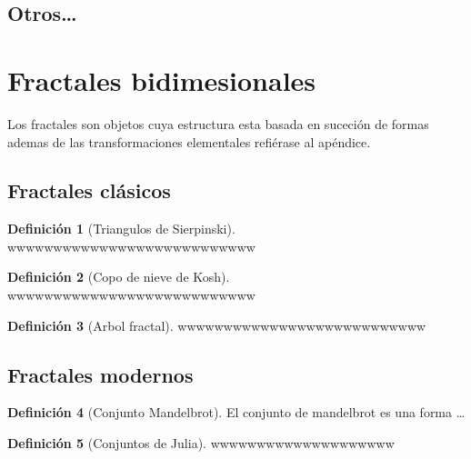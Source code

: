 \documentclass[
  16pt,
]{krantz}
\theoremstyle{definition}
\newtheorem{definition}{Definición}[chapter]
\theoremstyle{definition}
\theoremstyle{definition}
\theoremstyle{definition}
\theoremstyle{remark}
\begin{document}
\hypertarget{otros}{%
\subsection{Otros\ldots{}}\label{otros}}

\hypertarget{fractales-bidimesionales}{%
\section{Fractales bidimesionales}\label{fractales-bidimesionales}}

Los fractales son objetos cuya estructura esta basada en suceción de formas ademas de las transformaciones elementales refiérase al apéndice.

\hypertarget{fractales-cluxe1sicos}{%
\subsection{Fractales clásicos}\label{fractales-cluxe1sicos}}

\begin{definition}[Triangulos de Sierpinski]
\protect\hypertarget{def:sierpinski}{}{\label{def:sierpinski} {} }wwwwwwwwwwwwwwwwwwwwwwwwwww
\end{definition}

\begin{definition}[Copo de nieve de Kosh]
\protect\hypertarget{def:kosh}{}{\label{def:kosh} {} }wwwwwwwwwwwwwwwwwwwwwwwwwww
\end{definition}

\begin{definition}[Arbol fractal]
\protect\hypertarget{def:arbol}{}{\label{def:arbol} {} }wwwwwwwwwwwwwwwwwwwwwwwwwww
\end{definition}

\hypertarget{fractales-modernos}{%
\subsection{Fractales modernos}\label{fractales-modernos}}

\begin{definition}[Conjunto Mandelbrot]
\protect\hypertarget{def:mmandelbrot}{}{\label{def:mmandelbrot} {} }El conjunto de mandelbrot es una forma \ldots{}
\end{definition}

\begin{definition}[Conjuntos de Julia]
\protect\hypertarget{def:julia}{}{\label{def:julia} {} }wwwwwwwwwwwwwwwwwwww
\end{definition}
\end{document}
